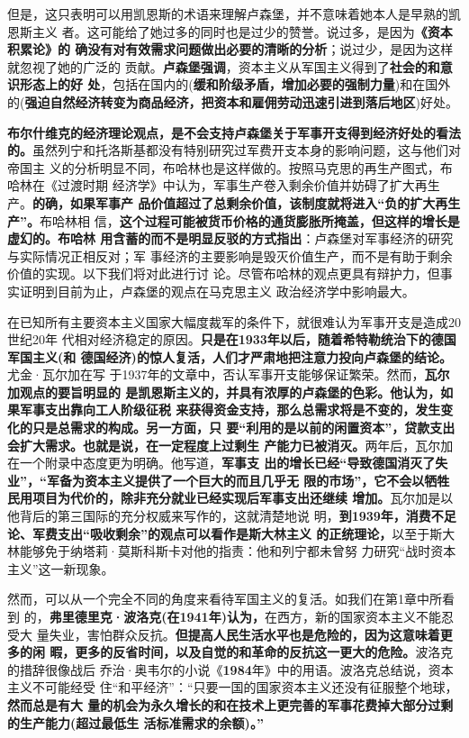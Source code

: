 但是，这只表明可以用凯恩斯的术语来理解卢森堡，并不意味着她本人是早熟的凯恩斯主义
者。这可能给了她过多的同时也是过少的赞誉。说过多，是因为\textbf{《资本积累论》的
  确没有对有效需求问题做出必要的清晰的分析}；说过少，是因为这样就忽视了她的广泛的
贡献。\textbf{卢森堡强调}，资本主义从军国主义得到了\textbf{社会的和意识形态上的好
  处}，包括在国内的(\textbf{缓和阶级矛盾，增加必要的强制力量})和在国外
的(\textbf{强迫自然经济转变为商品经济，把资本和雇佣劳动迅速引进到落后地区})好处。

\textbf{布尔什维克的经济理论观点，是不会支持卢森堡关于军事开支得到经济好处的看法
  的。}虽然列宁和托洛斯基都没有特别研究过军费开支本身的影响问题，这与他们对帝国主
义的分析明显不同，布哈林也是这样做的。按照马克思的再生产图式，布哈林在《过渡时期
经济学》中认为，军事生产卷入剩余价值并妨碍了扩大再生产。\textbf{的确，如果军事产
  品价值超过了总剩余价值，该制度就将进入“负的扩大再生产”。}布哈林相
信，\textbf{这个过程可能被货币价格的通货膨胀所掩盖，但这样的增长是虚幻的。布哈林
  用含蓄的而不是明显反驳的方式指出}：卢森堡对军事经济的研究与实际情况正相反对；军
事经济的主要影响是毁灭价值生产，而不是有助于剩余价值的实现。以下我们将对此进行讨
论。尽管布哈林的观点更具有辩护力，但事实证明到目前为止，卢森堡的观点在马克思主义
政治经济学中影响最大。

在已知所有主要资本主义国家大幅度裁军的条件下，就很难认为军事开支是造成20世纪20年
代相对经济稳定的原因。\textbf{只是在1933年以后，随着希特勒统治下的德国军国主义(和
  德国经济)的惊人复活，人们才严肃地把注意力投向卢森堡的结论。}尤金·瓦尔加在写
于1937年的文章中，否认军事开支能够保证繁荣。然而，\textbf{瓦尔加观点的要旨明显的
  是凯恩斯主义的，并具有浓厚的卢森堡的色彩。他认为，如果军事支出靠向工人阶级征税
  来获得资金支持，那么总需求将是不变的，发生变化的只是总需求的构成。另一方面，只
  要“利用的是以前的闲置资本”，贷款支出会扩大需求。也就是说，在一定程度上过剩生
  产能力已被消灭。}两年后，瓦尔加在一个附录中态度更为明确。他写道，\textbf{军事支
  出的增长已经“导致德国消灭了失业”，“军备为资本主义提供了一个巨大的而且几乎无
  限的市场”，它不会以牺牲民用项目为代价的，除非充分就业已经实现后军事支出还继续
  增加。}瓦尔加是以他背后的第三国际的充分权威来写作的，这就清楚地说
明，\textbf{到1939年，消费不足论、军费支出“吸收剩余”的观点可以看作是斯大林主义
  的正统理论，}以至于斯大林能够免于纳塔莉·莫斯科斯卡对他的指责：他和列宁都未曾努
力研究“战时资本主义”这一新现象。

然而，可以从一个完全不同的角度来看待军国主义的复活。如我们在第1章中所看到
的，\textbf{弗里德里克·波洛克(在1941年)认为，}在西方，新的国家资本主义不能忍受大
量失业，害怕群众反抗。\textbf{但提高人民生活水平也是危险的，因为这意味着更多的闲
  暇，更多的反省时间，以及自觉的和革命的反抗这一更大的危险。}波洛克的措辞很像战后
乔治·奥韦尔的小说《\textbf{1984}年》中的用语。波洛克总结说，资本主义不可能经受
住“和平经济”：“只要一国的国家资本主义还没有征服整个地球，\textbf{然而总是有大
  量的机会为永久增长的和在技术上更完善的军事花费掉大部分过剩的生产能力(超过最低生
  活标准需求的余额)。”}

